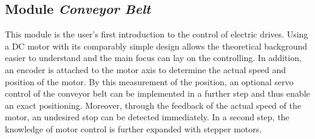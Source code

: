 \subsection{Module \textit{Conveyor Belt}}
     This module is the user's first introduction to the control of electric drives. Using a DC motor with its comparably simple design allows the theoretical background easier to understand and the main focus can lay on the controlling. In addition, an encoder is attached to the motor axis to determine the actual speed and position of the motor. By this measurement of the position, an optional servo control of the conveyor belt can be implemented in a further step and thus enable an exact positioning. Moreover, through the feedback of the actual speed of the motor, an undesired stop can be detected immediately. In a second step, the knowledge of motor control is further expanded with stepper motors. \\

